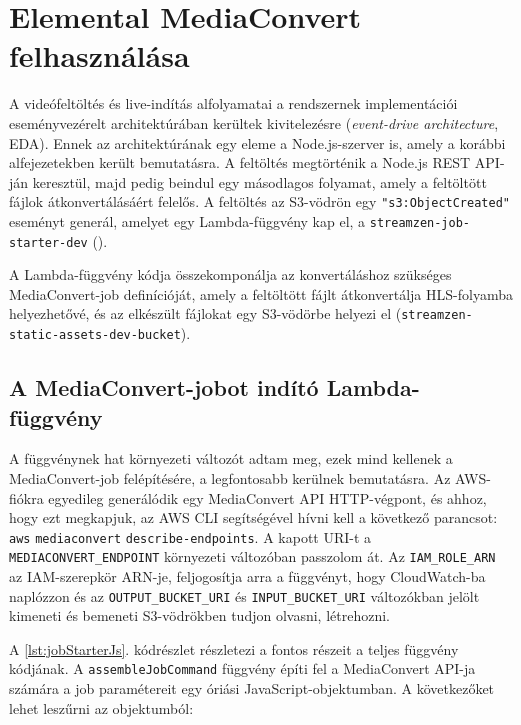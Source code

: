 \section{Elemental MediaConvert felhasználása}

A videófeltöltés és live-indítás alfolyamatai a rendszernek implementációi eseményvezérelt architektúrában kerültek kivitelezésre (\emph{event-drive architecture}, EDA). Ennek az architektúrának egy eleme a Node.js-szerver is, amely a korábbi alfejezetekben került bemutatásra. A feltöltés megtörténik a Node.js REST API-ján keresztül, majd pedig beindul egy másodlagos folyamat, amely a feltöltött fájlok átkonvertálásáért felelős. A feltöltés az S3-vödrön egy \verb|"s3:ObjectCreated"| eseményt generál, amelyet egy Lambda-függvény kap el, a \verb|streamzen-job-starter-dev| ().

A Lambda-függvény kódja összekomponálja az konvertáláshoz szükséges MediaConvert-job definícióját, amely a feltöltött fájlt átkonvertálja HLS-folyamba helyezhetővé, és az elkészült fájlokat egy S3-vödörbe helyezi el (\verb|streamzen-static-assets-dev-bucket|).

\subsection{A MediaConvert-jobot indító Lambda-függvény}

A függvénynek hat környezeti változót adtam meg, ezek mind kellenek a MediaConvert-job felépítésére, a legfontosabb kerülnek bemutatásra. Az AWS-fiókra egyedileg generálódik egy MediaConvert API HTTP-végpont, és ahhoz, hogy ezt megkapjuk, az AWS CLI segítségével hívni kell a következő parancsot: \verb|aws| \verb|mediaconvert| \verb|describe-endpoints|. A kapott URI-t a \verb|MEDIACONVERT_ENDPOINT| környezeti változóban passzolom át. Az \verb|IAM_ROLE_ARN| az IAM-szerepkör ARN-je, feljogosítja arra a függvényt, hogy CloudWatch-ba naplózzon és az \verb|OUTPUT_BUCKET_URI| és \verb|INPUT_BUCKET_URI| változókban jelölt kimeneti és bemeneti S3-vödrökben tudjon olvasni, létrehozni.

A \ref{lst:jobStarterJs}. kódrészlet részletezi a fontos részeit a teljes függvény kódjának. A \verb|assembleJobCommand| függvény építi fel a MediaConvert API-ja számára a job paramétereit egy óriási JavaScript-objektumban. A következőket lehet leszűrni az objektumból:

